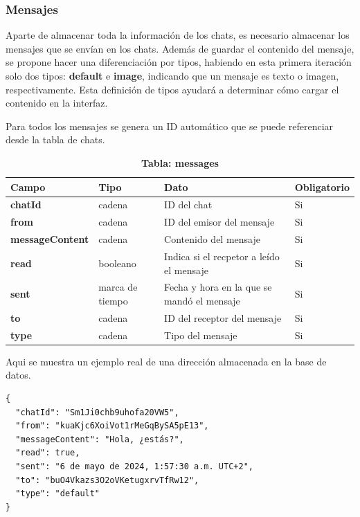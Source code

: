 \documentclass[a4paper, 12pt]{article}
\begin{document}
\subsubsection{Mensajes}

Aparte de almacenar toda la información de los chats, es necesario almacenar los mensajes que se envían en los chats. Además de guardar el contenido del mensaje, se propone hacer una diferenciación por tipos, habiendo en esta primera iteración solo dos tipos: \textbf{default} e \textbf{image}, indicando que un mensaje es texto o imagen, respectivamente. Esta definición de tipos ayudará a determinar cómo cargar el contenido en la interfaz.

Para todos los mensajes se genera un ID automático que se puede referenciar desde la tabla de chats.

\begin{table}[H]
\captionsetup{justification=raggedright,singlelinecheck=false}
\caption{\textbf{Tabla: messages}}
\label{tab:messages}
	\begin{tabular}{|m{3.2cm}|m{2cm}|m{5cm}|m{3cm}|}
	\hline
	\textbf{Campo} & \textbf{Tipo} & \textbf{Dato} & \textbf{Obligatorio} \\ 
	\hline
	\textbf{chatId} & cadena & ID del chat & Si \\ 
	\hline
	\textbf{from} & cadena & ID del emisor del mensaje & Si \\ 
	\hline
	\textbf{messageContent} & cadena & Contenido del mensaje & Si \\ 
	\hline
	\textbf{read} & booleano & Indica si el recpetor a leído el mensaje & Si \\ 
	\hline
	\textbf{sent} & marca de tiempo & Fecha y hora en la que se mandó el mensaje & Si \\ 
	\hline
	\textbf{to} & cadena & ID del receptor del mensaje & Si \\ 
	\hline
	\textbf{type} & cadena & Tipo del mensaje & Si \\ 
	\hline
	\end{tabular}
\end{table}

Aqui se muestra un ejemplo real de una dirección almacenada en la base de datos.

\begin{verbatim}
{
  "chatId": "Sm1Ji0chb9uhofa20VW5",
  "from": "kuaKjc6XoiVot1rMeGqBySA5pE13",
  "messageContent": "Hola, ¿estás?",
  "read": true,
  "sent": "6 de mayo de 2024, 1:57:30 a.m. UTC+2",
  "to": "buO4Vkazs3O2oVKetugxrvTfRw12",
  "type": "default"
}
\end{verbatim}
\end{document}
